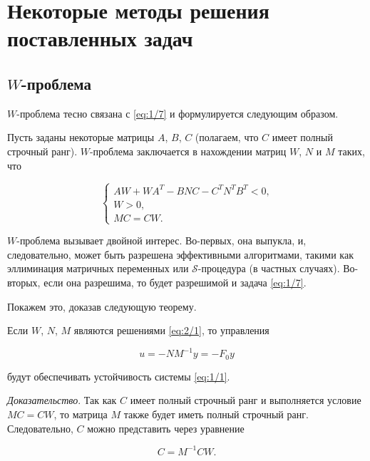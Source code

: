 \chapter{Некоторые методы решения поставленных задач}

\section{$W$-проблема}

$W$-проблема тесно связана с \vref{eq:1/7} и формулируется следующим образом.

Пусть заданы некоторые матрицы $A$, $B$, $C$ (полагаем, что $C$ имеет полный строчный ранг). $W$-проблема заключается в нахождении матриц $W$, $N$ и $M$ таких, что

\begin{equation}
\label{eq:2/1}
\left\{ \begin{array}{l}
         AW + WA^T - BNC - C^TN^TB^T < 0\mbox{,} \\
         W > 0\mbox{,} \\
         MC = CW\mbox{.}
        \end{array}
\right.
\end{equation}

$W$-проблема вызывает двойной интерес. Во-первых, она выпукла, и, следовательно, может быть разрешена эффективными алгоритмами\cite{BOYD}, такими как эллиминация матричных переменных или $\mathcal{S}$-процедура (в частных случаях). Во-вторых, если она разрешима, то будет разрешимой и задача \vref{eq:1/7}.

Покажем это, доказав следующую теорему.

\begin{teo}
\label{teo:2/1}
Если $W$, $N$, $M$ являются решениями \vref{eq:2/1}, то управления

$$
u = -NM^{-1}y = -F_0y
$$

\begin{flushleft}
будут обеспечивать устойчивость системы \vref{eq:1/1}.
\end{flushleft}
\end{teo}

\emph{Доказательство}.
Так как $C$ имеет полный строчный ранг и выполняется условие $MC=CW$, то матрица $M$ также будет иметь полный строчный ранг. Следовательно, $C$ можно представить через уравнение

\begin{equation}
\label{eq:2/2}
C = M^{-1}CW\mbox{.}
\end{equation}

